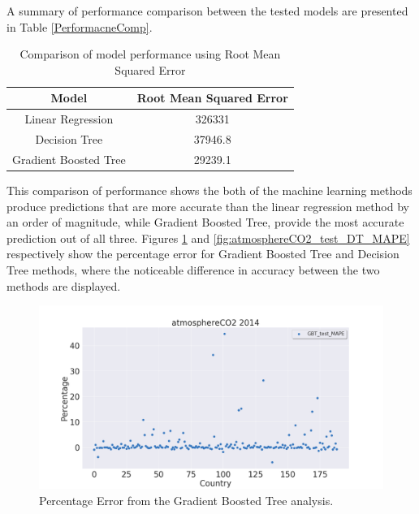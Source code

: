 \documentclass[11pt,a4paper,titlepage]{article}
\begin{document}
A summary of performance comparison between the tested models are presented in Table \ref{PerformacneComp}.

\begin{table}[htbp!]
    \begin{center}
        \begin{tabular}{ |c|c| } 
        \hline
        Model & Root Mean Squared Error \\ 
        \hline
        Linear Regression & 326331 \\
        Decision Tree & 37946.8 \\
        Gradient Boosted Tree & 29239.1 \\
        \hline
        \end{tabular}
        \caption{Comparison of model performance using Root Mean Squared Error}
        \label{PerformanceComp}
    \end{center}
\end{table}

This comparison of performance shows the both of the machine learning methods produce predictions that are more accurate than the linear regression method by an order of magnitude, while Gradient Boosted Tree, provide the most accurate prediction out of all three. Figures \ref{fig:atmosphereCO2_test_GBT_MAPE} and \ref{fig:atmosphereCO2_test_DT_MAPE} respectively show the percentage error for Gradient Boosted Tree and Decision Tree methods, where the noticeable difference in accuracy between the two methods are displayed.

\begin{figure}[!htbp]
    \begin{center}
        \includegraphics[width=\textwidth]{../Plots/atmosphereCO2_test_GBT_MAPE.png}
        \caption{Percentage Error from the Gradient Boosted Tree analysis.}
        \label{fig:atmosphereCO2_test_GBT_MAPE}
    \end{center}
\end{figure}
\end{document}
